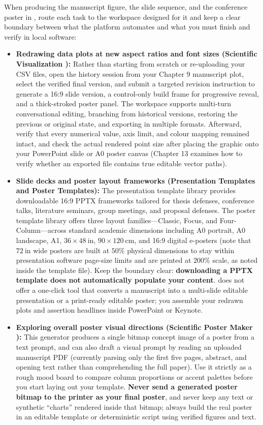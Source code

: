 When producing the manuscript figure, the slide sequence, and the conference poster in \scidraw{}, route each task to the workspace designed for it and keep a clear boundary between what the platform automates and what you must finish and verify in local software:
\begin{itemize}
\item \textbf{Redrawing data plots at new aspect ratios and font sizes (Scientific Visualization ):} Rather than starting from scratch or re-uploading your CSV files, open the history session from your Chapter 9 manuscript plot, select the verified final version, and submit a targeted revision instruction to generate a 16:9 slide version, a control-only build frame for progressive reveal, and a thick-stroked poster panel. The workspace supports multi-turn conversational editing, branching from historical versions, restoring the previous or original state, and exporting in multiple formats. Afterward, verify that every numerical value, axis limit, and colour mapping remained intact, and check the actual rendered point size after placing the graphic onto your PowerPoint slide or A0 poster canvas (Chapter 13 examines how to verify whether an exported file contains true editable vector paths).
\item \textbf{Slide decks and poster layout frameworks (Presentation Templates  and Poster Templates):} The presentation template library provides downloadable 16:9 PPTX frameworks tailored for thesis defenses, conference talks, literature seminars, group meetings, and proposal defenses. The poster template library offers three layout families---Classic, Focus, and Four-Column---across standard academic dimensions including A0 portrait, A0 landscape, A1, $36 \times 48\ \text{in}$, $90 \times 120\ \text{cm}$, and 16:9 digital e-posters (note that $72\ \text{in}$ wide posters are built at $50\%$ physical dimensions to stay within presentation software page-size limits and are printed at $200\%$ scale, as noted inside the template file). Keep the boundary clear: \textbf{downloading a PPTX template does not automatically populate your content}. \scidraw{} does not offer a one-click tool that converts a manuscript into a multi-slide editable presentation or a print-ready editable poster; you assemble your redrawn plots and assertion headlines inside PowerPoint or Keynote.
\item \textbf{Exploring overall poster visual directions (Scientific Poster Maker ):} This generator produces a single bitmap concept image of a poster from a text prompt, and can also draft a visual prompt by reading an uploaded manuscript PDF (currently parsing only the first five pages, abstract, and opening text rather than comprehending the full paper). Use it strictly as a rough mood board to compare column proportions or accent palettes before you start laying out your template. \textbf{Never send a generated poster bitmap to the printer as your final poster}, and never keep any text or synthetic ``charts'' rendered inside that bitmap; always build the real poster in an editable template or deterministic script using verified figures and text.

\end{itemize}
